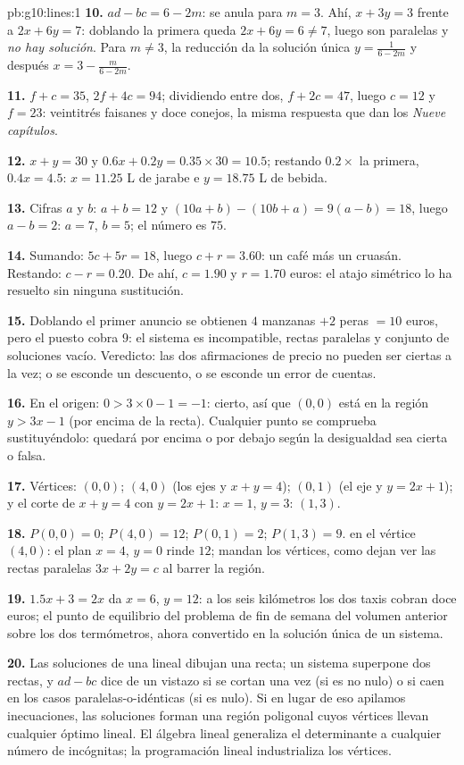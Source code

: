 \begin{solution}{pb:g10:lines:1}
\textbf{10.} $ad - bc = 6 - 2m$: se anula para $m = 3$. Ahí,
$x + 3y = 3$ frente a $2x + 6y = 7$: doblando la primera queda
$2x + 6y = 6 \neq 7$, luego son paralelas y \emph{no hay solución}. Para
$m \neq 3$, la reducción da la solución única $y = \frac{1}{6 - 2m}$ y
después $x = 3 - \frac{m}{6 - 2m}$.

\textbf{11.} $f + c = 35$, $2f + 4c = 94$; dividiendo entre dos,
$f + 2c = 47$, luego $c = 12$ y $f = 23$: veintitrés faisanes y doce
conejos, la misma respuesta que dan los \emph{Nueve capítulos}.

\textbf{12.} $x + y = 30$ y $0.6x + 0.2y = 0.35 \times 30 = 10.5$;
restando $0.2 \times$ la primera, $0.4x = 4.5$: $x = 11.25$ L de jarabe e
$y = 18.75$ L de bebida.

\textbf{13.} Cifras $a$ y $b$: $a + b = 12$ y
$(10a + b) - (10b + a) = 9(a - b) = 18$, luego $a - b = 2$: $a = 7$,
$b = 5$; el número es $75$.

\textbf{14.} Sumando: $5c + 5r = 18$, luego $c + r = 3.60$: un café más un
cruasán. Restando: $c - r = 0.20$. De ahí, $c = 1.90$ y $r = 1.70$ euros:
el atajo simétrico lo ha resuelto sin ninguna sustitución.

\textbf{15.} Doblando el primer anuncio se obtienen $4$ manzanas $+ 2$
peras $= 10$ euros, pero el puesto cobra $9$: el sistema es incompatible,
rectas paralelas y conjunto de soluciones vacío. Veredicto: las dos
afirmaciones de precio no pueden ser ciertas a la vez; o se esconde un
descuento, o se esconde un error de cuentas.

\textbf{16.} En el origen: $0 > 3 \times 0 - 1 = -1$: cierto, así que
$(0,0)$ está en la región $y > 3x - 1$ (por encima de la recta). Cualquier
punto se comprueba sustituyéndolo: quedará por encima o por debajo según
la desigualdad sea cierta o falsa.

\textbf{17.} Vértices: $(0, 0)$; $(4, 0)$ (los ejes y $x + y = 4$);
$(0, 1)$ (el eje y $y = 2x + 1$); y el corte de $x + y = 4$ con
$y = 2x + 1$: $x = 1$, $y = 3$: $(1, 3)$.

\textbf{18.} $P(0,0) = 0$; $P(4, 0) = 12$; $P(0, 1) = 2$; $P(1, 3) = 9$.
 en el vértice $(4, 0)$: el plan $x = 4$, $y = 0$ rinde $12$; mandan
los vértices, como dejan ver las rectas paralelas $3x + 2y = c$ al barrer
la región.

\textbf{19.} $1.5x + 3 = 2x$ da $x = 6$, $y = 12$: a los seis kilómetros
los dos taxis cobran doce euros; el punto de equilibrio del problema de
fin de semana del volumen anterior sobre los dos termómetros, ahora
convertido en la solución única de un sistema.

\textbf{20.} Las soluciones de una  lineal dibujan una recta; un
sistema superpone dos rectas, y $ad - bc$ dice de un vistazo si se cortan
una vez (si es no nulo) o si caen en los casos paralelas-o-idénticas (si
es nulo). Si en lugar de eso apilamos inecuaciones, las soluciones forman
una región poligonal cuyos vértices llevan cualquier óptimo lineal. El
álgebra lineal generaliza el determinante a cualquier número de
incógnitas; la programación lineal industrializa los vértices.
\end{solution}
